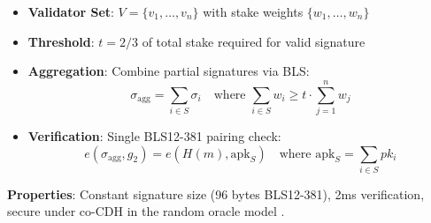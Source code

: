 \begin{itemize}[leftmargin=1.1em]
  \item \textbf{Validator Set}: $V = \{v_1, \ldots, v_n\}$ with stake weights $\{w_1, \ldots, w_n\}$
  \item \textbf{Threshold}: $t = 2/3$ of total stake required for valid signature
  \item \textbf{Aggregation}: Combine partial signatures via BLS:
  \begin{equation}
    \sigma_{\text{agg}} = \sum_{i \in S} \sigma_i \quad \text{where } \sum_{i \in S} w_i \geq t \cdot \sum_{j=1}^n w_j
  \end{equation}
  \item \textbf{Verification}: Single BLS12-381 pairing check:
  \begin{equation}
    e(\sigma_{\text{agg}}, g_2) = e(H(m), \text{apk}_S) \quad \text{where } \text{apk}_S = \sum_{i \in S} pk_i
  \end{equation}
\end{itemize}

\textbf{Properties}: Constant signature size (96 bytes BLS12-381), 2ms verification, secure under co-CDH in the random oracle model \cite{boneh2001bls}.

